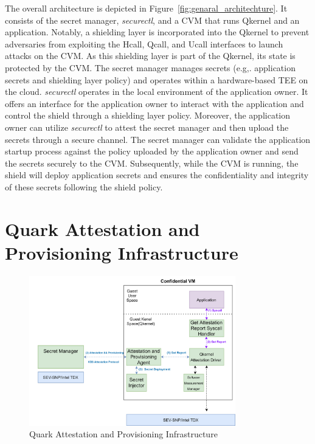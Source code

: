 The overall architecture is depicted in Figure~\ref{fig:genaral_architechture}. It consists of the secret manager, \emph{securectl}, and a \acrshort{CVM} that runs Qkernel and an application. Notably, a shielding layer is incorporated into the Qkernel to prevent adversaries from exploiting the Hcall, Qcall, and Ucall interfaces to launch attacks on the 
\acrshort{CVM}. As this shielding layer is part of the Qkernel, its state is protected by the \acrshort{CVM}. The secret manager manages secrets (e.g,. application secrets and shielding layer policy) and operates within a hardware-based TEE on the cloud. \emph{securectl} operates in the local environment of the application owner. It offers an interface for the application owner 
to interact with the application and control the shield through a shielding layer policy. Moreover, the application owner can utilize \emph{securectl} to attest the secret manager and then upload the secrets through a secure channel. The secret manager can validate the application startup process against the policy uploaded by the application owner and send the secrets securely to the \acrshort{CVM}. 
Subsequently, while the \acrshort{CVM} is running, the shield will deploy application secrets and ensures the confidentiality and integrity of these secrets following the shield policy.


\section{Quark Attestation and Provisioning Infrastructure}
\label{sec:design_Quark_Attestation_and_Provisioning_Infrastructure}

\begin{figure}[!htb]
    \centering
    \includegraphics[width=0.8\textwidth]{images/Qkernel_attestation_infrastructurc.png}
    \caption[Quark Attestation and Provisioning Infrastructure]{Quark Attestation and Provisioning Infrastructure}
    \label{fig:Qkernel_attestation_infrastructurc}
\end{figure}


